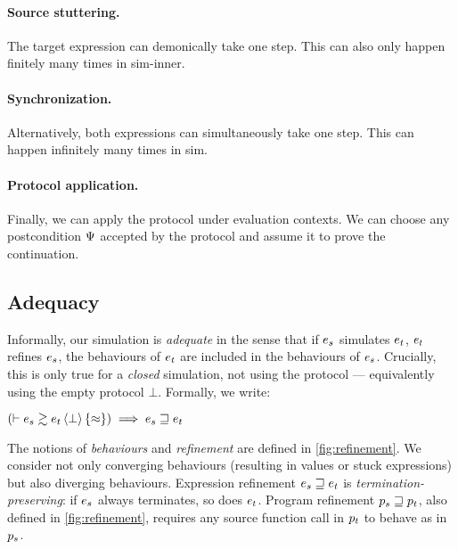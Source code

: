 \paragraph{ Source stuttering.}
The target expression can demonically take one step.
This can also only happen finitely many times in \textcolor{\iSimLfpColor}{sim-inner}.

\paragraph{ Synchronization.}
Alternatively, both expressions can simultaneously take one step.
This can happen infinitely many times in \textcolor{\iSimGfpColor}{sim}.

\paragraph{ Protocol application.}
Finally, we can apply the protocol under evaluation contexts.
We can choose any postcondition $\Psi$ accepted by the protocol and assume it to prove the continuation.

\subsection{Adequacy}

Informally, our simulation is \emph{adequate} in the sense that if $\datalangExpr_s$ simulates $\datalangExpr_t$, $\datalangExpr_t$ refines $\datalangExpr_s$, \ie the behaviours of $\datalangExpr_t$ are included in the behaviours of $\datalangExpr_s$.
Crucially, this is only true for a \emph{closed} simulation, \ie not using the protocol --- equivalently using the empty protocol $\bot$.
Formally, we write:

\begin{lemma} \label{thm:adequacy}
    $
        \left( \vdash \iSimv[\bot]{\iSimilar}{\datalangExpr_s}{\datalangExpr_t} \right) \implies
        \datalangExpr_s \refined \datalangExpr_t
    $
\end{lemma}

The notions of \emph{behaviours} and \emph{refinement} are defined in \cref{fig:refinement}.
We consider not only converging behaviours (resulting in values or stuck expressions) but also diverging behaviours.
Expression refinement $\datalangExpr_s \refined \datalangExpr_t$ is \emph{termination-preserving}: if $\datalangExpr_s$ always terminates, so does $\datalangExpr_t$.
Program refinement $\datalangProg_s \refined \datalangProg_t$, also defined in \cref{fig:refinement}, requires any source function call in $\datalangProg_t$ to behave as in $\datalangProg_s$.

